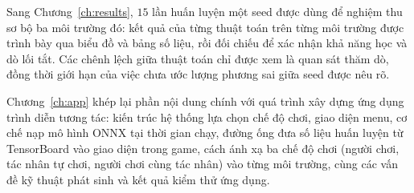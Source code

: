 Sang Chương~\ref{ch:results}, $15$ lần huấn luyện một seed được dùng để nghiệm thu sơ bộ ba môi trường đó:
kết quả của từng thuật toán trên
từng môi trường được trình bày qua biểu đồ và bảng số liệu, rồi đối chiếu để xác nhận khả
năng học và dò lối tắt. Các chênh lệch giữa thuật toán chỉ được xem là quan sát thăm dò,
đồng thời giới hạn của việc chưa ước lượng phương sai giữa seed được nêu rõ.

\indent Chương~\ref{ch:app} khép lại phần nội dung chính với quá trình xây dựng ứng dụng
trình diễn tương tác: kiến trúc hệ thống lựa chọn chế độ chơi, giao diện menu, cơ chế nạp
mô hình ONNX tại thời gian chạy, đường ống đưa số liệu huấn luyện từ TensorBoard vào giao
diện trong game, cách ánh xạ ba chế độ chơi (người chơi, tác nhân tự chơi, người chơi cùng
tác nhân) vào từng môi trường, cùng các vấn đề kỹ thuật phát sinh và kết quả kiểm thử ứng
dụng.
